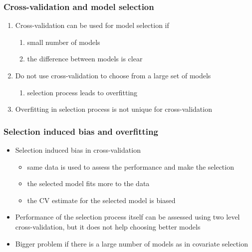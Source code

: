 \documentclass[10pt]{beamer}
\begin{document}
\begin{frame}{}

\frametitle{Cross-validation and model selection}

  \begin{enumerate}
  \item<1-> Cross-validation can be used for model selection if
    \begin{enumerate}
      \item small number of models
      \item the difference between models is clear
    \end{enumerate}
  \item<2-> Do not use cross-validation to choose from a large set of models
    \begin{enumerate}
    \item selection process leads to overfitting
    \end{enumerate}
  \item<3-> Overfitting in selection process is not unique for cross-validation
  \end{enumerate}
\end{frame}

\begin{frame}



\frametitle{Selection induced bias and overfitting}

  \begin{itemize}
  \item Selection induced bias in cross-validation
    \begin{itemize}
    \item same data is used to assess the performance and make the selection
    \item the selected model fits more to the data
    \item the CV estimate for the selected model is biased
    \end{itemize}
    \pause
  \item Performance of the selection process itself can be assessed
    using two level cross-validation, but it does not help choosing
    better models
    \pause
  \item Bigger problem if there is a large number of models as in
    covariate selection
  \end{itemize}

\end{frame}
\end{document}
